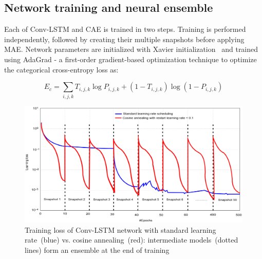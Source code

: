 \subsection{Network training and neural ensemble} %
Each of Conv-LSTM and CAE is trained in two steps. Training is performed independently, followed by creating their multiple snapshots before applying MAE. Network parameters are initialized with Xavier initialization~\cite{xavier} and trained using AdaGrad - a first-order gradient-based optimization technique to optimize the categorical cross-entropy loss as: 

\vspace{-2mm}
\begin{equation} 
    E_{c} = \sum_{i, j, k} T_{i, j, k} \log P_{i, j, k}+\left(1-T_{i, j, k}\right) \log \left(1-P_{i, j, k}\right)
    \label{eq:cce3}
\end{equation} 

\begin{figure}
    \centering
    \includegraphics[scale=0.6]{images/cac.png}
    \caption[Cosine cyclic annealing-based training]{Training loss of Conv-LSTM network with standard learning rate~(blue) vs. cosine annealing~(red): intermediate models~(dotted lines) form an ensemble at the end of training~\cite{karimACCA2019}}
    \label{fig:ca}
    \vspace{-2mm}
\end{figure}

